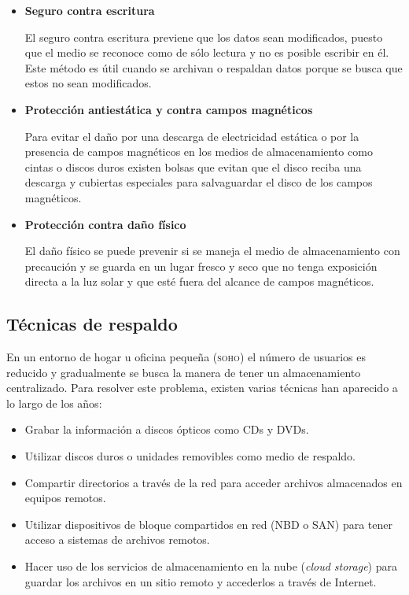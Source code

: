     \begin{itemize}

      \item \textbf{Seguro contra escritura}

El seguro contra escritura previene que los datos sean modificados, puesto que el medio se reconoce como de s\'{o}lo lectura y no es posible escribir en \'{e}l. Este m\'{e}todo es \'{u}til cuando se archivan o respaldan datos porque se busca que estos no sean modificados.

      \item \textbf{Protecci\'{o}n antiest\'{a}tica y contra campos magn\'{e}ticos}

Para evitar el da\~{n}o por una descarga de electricidad est\'{a}tica o por la presencia de campos magn\'{e}ticos en los medios de almacenamiento como cintas o discos duros existen bolsas que evitan que el disco reciba una descarga y cubiertas especiales para salvaguardar el disco de los campos magn\'{e}ticos.

      \item \textbf{Protecci\'{o}n contra da\~{n}o f\'{i}sico}

El da\~{n}o f\'{i}sico se puede prevenir si se maneja el medio de almacenamiento con precauci\'{o}n y se guarda en un lugar fresco y seco que no tenga exposici\'{o}n directa a la luz solar y que est\'{e} fuera del alcance de campos magn\'{e}ticos.

    \end{itemize}

  \subsection {T\'{e}cnicas de respaldo}


En un entorno de hogar u oficina peque\~{n}a (\textsc{soho}) el n\'{u}mero de usuarios es reducido y gradualmente se busca la manera de tener un almacenamiento centralizado. Para resolver este problema, existen varias t\'{e}cnicas han aparecido a lo largo de los a\~{n}os:

    \begin{itemize}
      \item Grabar la informaci\'{o}n a discos \'{o}pticos como CDs y DVDs.
      \item Utilizar discos duros o unidades removibles como medio de respaldo.
      \item Compartir directorios a trav\'{e}s de la red para acceder archivos almacenados en equipos remotos.
      \item Utilizar dispositivos de bloque compartidos en red (\textsc{NBD} o \textsc{SAN}) para tener acceso a sistemas de archivos remotos.
      \item Hacer uso de los servicios de almacenamiento en la nube (\textit{cloud storage}) para guardar los archivos en un sitio remoto y accederlos a trav\'{e}s de Internet.
    \end{itemize}


